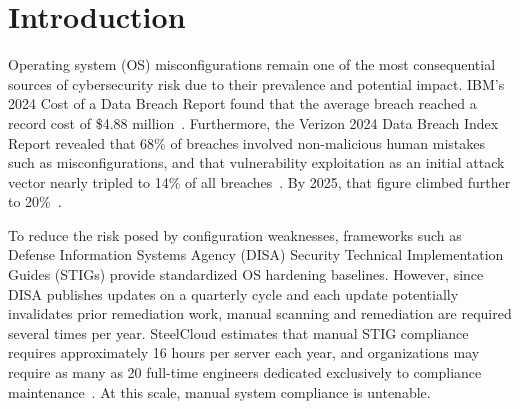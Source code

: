 \documentclass[pdflatex,sn-mathphys-num]{sn-jnl}%
\begin{document}

\maketitle


\section{Introduction}\label{sec:introduction}

Operating system (OS) misconfigurations remain one of the most consequential sources of cybersecurity risk due to their prevalence and potential impact. IBM's 2024 Cost of a Data Breach Report found that the average breach reached a record cost of \$4.88 million~\cite{ibm2024breach}. Furthermore, the Verizon 2024 Data Breach Index Report revealed that 68\% of breaches involved non-malicious human mistakes such as misconfigurations, and that vulnerability exploitation as an initial attack vector nearly tripled to 14\% of all breaches~\cite{verizon2024dbir}. By 2025, that figure climbed further to 20\%~\cite{verizon2025dbir}.

To reduce the risk posed by configuration weaknesses, frameworks such as Defense Information Systems Agency (DISA) Security Technical Implementation Guides (STIGs) provide standardized OS hardening baselines. However, since DISA publishes updates on a quarterly cycle and each update potentially invalidates prior remediation work, manual scanning and remediation are required several times per year. SteelCloud estimates that manual STIG compliance requires approximately 16 hours per server each year, and organizations may require as many as 20 full-time engineers dedicated exclusively to compliance maintenance~\cite{steelcloud2023case}. At this scale, manual system compliance is untenable.
\end{document}
